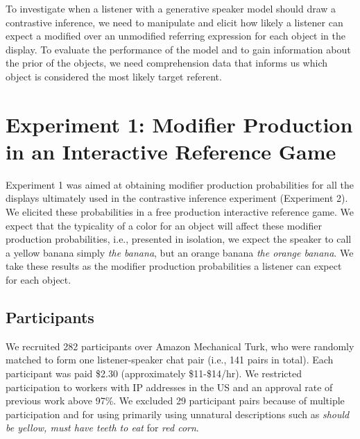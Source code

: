 \documentclass[10pt,letterpaper]{article}
\newcommand{\ek}[1]{\textcolor{Orange}{[ek: #1]}}
\newcommand{\jd}[1]{\textcolor{Purple}{[jd: #1]}}
\begin{document}


To investigate when a listener with a generative speaker model should draw a contrastive inference, we need to manipulate and elicit how likely a listener can expect a modified over an unmodified referring expression for each object in the display. To evaluate the performance of the model and to gain information about the prior of the objects, we need comprehension data that informs us which object is considered the most likely target referent.


\section{Experiment 1: Modifier Production in an Interactive Reference Game}

Experiment 1 was aimed at obtaining modifier production probabilities for all the displays ultimately used in the contrastive inference experiment (Experiment 2). We elicited these probabilities in a free production interactive reference game. We expect that the typicality of a color for an object will affect these modifier production probabilities, i.e., presented in isolation, we expect the speaker to call a yellow banana simply \textit{the banana}, but an orange banana \textit{the orange banana}. We take these results as the modifier production probabilities a listener can expect for each object.

\subsection{Participants}
We recruited 282 participants over Amazon Mechanical Turk, who were randomly matched to form one listener-speaker chat pair (i.e., 141 pairs in total). 
Each participant was paid \$2.30 (approximately \$11-\$14/hr). We restricted participation to workers with IP addresses in the US and an approval rate of previous work above 97\%.
We excluded 29 participant pairs because of multiple participation and for using primarily using unnatural descriptions such as \textit{should be yellow, must have teeth to eat} for \textit{red corn}.
\end{document}

